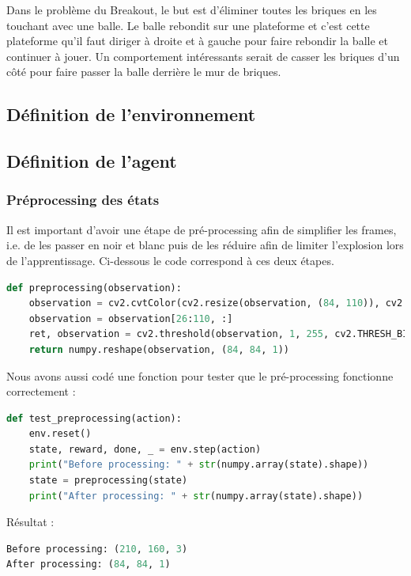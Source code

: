 \documentclass[10pt,a4paper]{article}
\begin{document}
Dans le problème du Breakout, le but est d'éliminer toutes les briques en les touchant avec une balle. Le balle rebondit sur une plateforme et c'est cette plateforme qu'il faut diriger à droite et à gauche pour faire rebondir la balle et continuer à jouer. Un comportement intéressants serait de casser les briques d'un côté pour faire passer la balle derrière le mur de briques. 

\subsection{Définition de l'environnement}

\subsection{Définition de l'agent}

\subsubsection{Préprocessing des états}

Il est important d'avoir une étape de pré-processing afin de \og simplifier \fg{} les frames, i.e. de les passer en noir et blanc puis de les réduire afin de limiter l'explosion lors de l'apprentissage. Ci-dessous le code correspond à ces deux étapes.

\begin{lstlisting}[language=Python,caption=Préprocessing des états]
def preprocessing(observation):
    observation = cv2.cvtColor(cv2.resize(observation, (84, 110)), cv2.COLOR_BGR2GRAY)
    observation = observation[26:110, :]
    ret, observation = cv2.threshold(observation, 1, 255, cv2.THRESH_BINARY)
    return numpy.reshape(observation, (84, 84, 1))
\end{lstlisting}

Nous avons aussi codé une fonction pour tester que le pré-processing fonctionne correctement :

\begin{lstlisting}[language=Python,caption=Test du préprocessing des états]
def test_preprocessing(action):
    env.reset()
    state, reward, done, _ = env.step(action)
    print("Before processing: " + str(numpy.array(state).shape))
    state = preprocessing(state)
    print("After processing: " + str(numpy.array(state).shape))
\end{lstlisting}
Résultat :
\begin{lstlisting}[language=Python]
Before processing: (210, 160, 3)
After processing: (84, 84, 1)
\end{lstlisting}
\end{document}
